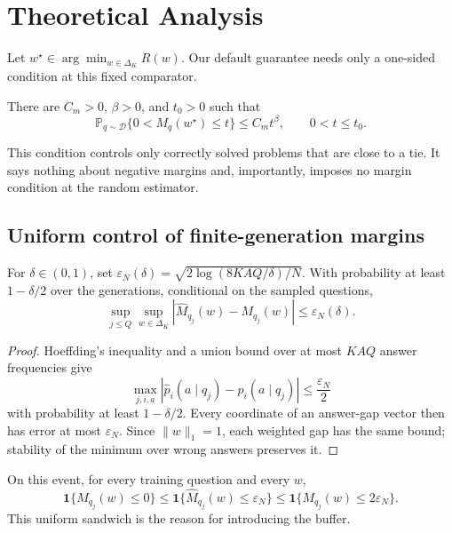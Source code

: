 \section{Theoretical Analysis}
\label{sec:theory}

Let \(w^\star\in\arg\min_{w\in\Delta_K}R(w)\).  Our default guarantee needs
only a one-sided condition at this fixed comparator.

\begin{assumption}
\label{ass:comp-margin}
There are \(C_m>0\), \(\beta>0\), and \(t_0>0\) such that
\[
\mathbb P_{q\sim\mathcal D}
\{0<M_q(w^\star)\le t\}
\le C_m t^\beta,
\qquad 0<t\le t_0.
\]
\end{assumption}

This condition controls only correctly solved problems that are close to a
tie.  It says nothing about negative margins and, importantly, imposes no
margin condition at the random estimator.

\subsection{Uniform control of finite-generation margins}
\label{sec:theory-concentration}

\begin{lemma}
\label{lem:margin-accuracy}
For \(\delta\in(0,1)\), set
\(\varepsilon_N(\delta)=\sqrt{2\log(8KAQ/\delta)/N}\).  With probability at
least \(1-\delta/2\) over the generations, conditional on the sampled questions,
\[
\sup_{j\le Q}\sup_{w\in\Delta_K}
|\widehat M_{q_j}(w)-M_{q_j}(w)|
\le\varepsilon_N(\delta).
\]
\end{lemma}

\begin{proof}
Hoeffding's inequality and a union bound over at most \(KAQ\) answer
frequencies give
\[
\max_{j,i,a}
|\widehat p_i(a\mid q_j)-p_i(a\mid q_j)|
\le\frac{\varepsilon_N}{2}
\]
with probability at least \(1-\delta/2\).  Every coordinate of an answer-gap
vector then has error at most \(\varepsilon_N\).  Since
\(\|w\|_1=1\), each weighted gap has the same bound; stability of the minimum
over wrong answers preserves it.
\end{proof}

On this event, for every training question and every \(w\),
\begin{equation}
\mathbf 1\{M_{q_j}(w)\le0\}
\le
\mathbf 1\{\widehat M_{q_j}(w)\le\varepsilon_N\}
\le
\mathbf 1\{M_{q_j}(w)\le2\varepsilon_N\}.
\label{eq:indicator-sandwich}
\end{equation}
This uniform sandwich is the reason for introducing the buffer.

